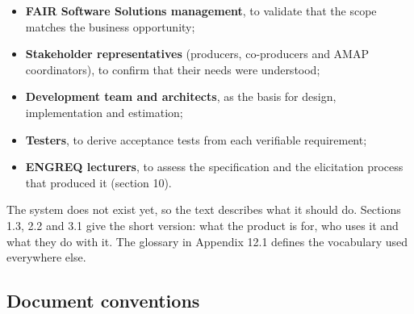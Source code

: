 \documentclass[11pt,a4paper]{article}
\begin{document}
\begin{itemize}
  \item \textbf{FAIR Software Solutions management}, to validate that the scope matches the business opportunity;
  \item \textbf{Stakeholder representatives} (producers, co-producers and AMAP coordinators), to confirm that their needs were understood;
  \item \textbf{Development team and architects}, as the basis for design, implementation and estimation;
  \item \textbf{Testers}, to derive acceptance tests from each verifiable requirement;
  \item \textbf{ENGREQ lecturers}, to assess the specification and the elicitation process that produced it (section 10).
\end{itemize}
The system does not exist yet, so the text describes what it should do. Sections 1.3, 2.2 and 3.1 give the short version: what the product is for, who uses it and what they do with it. The glossary in Appendix 12.1 defines the vocabulary used everywhere else.


\subsection{Document conventions}
\end{document}
